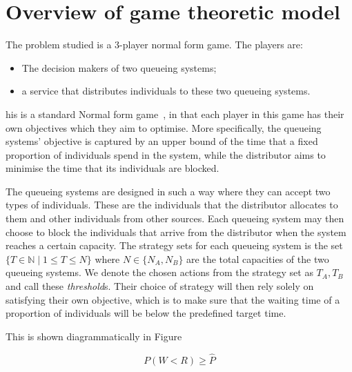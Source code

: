 \section{Overview of game theoretic model}

The problem studied is a 3-player normal form game. The players are:
  
\begin{itemize}
    \item The decision makers of two queueing systems;
    \item a service that distributes individuals to these two queueing systems.
\end{itemize}

his is a standard Normal form game~\cite{},  
in that each player in this game has their own objectives which they aim to 
optimise.
More specifically, the queueing systems' objective is captured by an upper bound
of the time that a fixed proportion of individuals spend in the system, 
while the distributor aims to minimise the time that its individuals 
are blocked.   

The queueing systems are designed in such a way where they can accept two types
of individuals. 
These are the individuals that the distributor allocates to them and 
other individuals from other sources. 
Each queueing system may then choose to block the individuals that arrive from 
the distributor when the system reaches a certain capacity. 
The strategy sets for each queueing system is the set 
\( \{T \in \mathbb{N} \;|\; 1 \leq T \leq N\} \) where \(N \in\{N_A, N_B\}\) are 
the total capacities of the two queueing systems. We denote the chosen actions 
from the strategy set as \(T_A, T_B\) and call these \textit{threshold}s.
Their choice of strategy will then rely solely on satisfying their own 
objective, which is to make sure that the waiting time of a proportion of 
individuals will be below the predefined target time.

This is shown diagrammatically in Figure %


\begin{equation}
    P(W < R) \geq \hat{P}
\end{equation}

